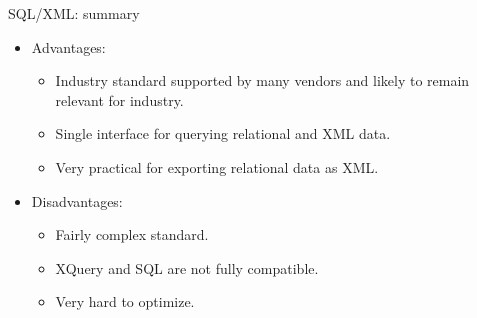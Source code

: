 







\begin{frame}{SQL/XML: summary}

\begin{itemize}[-]
\item Advantages:
\begin{itemize}[-]
\item Industry standard supported by many vendors and likely to remain relevant for industry.
\item Single interface for querying relational and XML data.
\item Very practical for \alert{exporting relational data as XML}.
\end{itemize}
\item Disadvantages:
\begin{itemize}[-]
\item Fairly complex standard. 
\item XQuery and SQL are not fully compatible. 
\item Very hard to optimize.
\end{itemize}
\end{itemize}

\end{frame}


